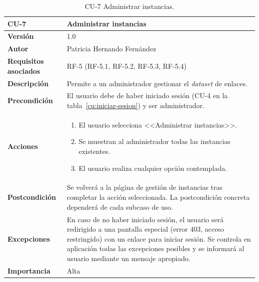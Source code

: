 \begin{table}[p]
	\centering
	\begin{tabularx}{\linewidth}{ p{} p{} }
		\toprule
		\textbf{CU-7}    & \textbf{Administrar instancias}\\
		\toprule
		\textbf{Versión}              & 1.0    \\
		\textbf{Autor}                & Patricia Hernando Fernández \\
		\textbf{Requisitos asociados} & RF-5 (RF-5.1, RF-5.2, RF-5.3, RF-5.4) \\
		\textbf{Descripción}          & Permite a un administrador gestionar el \textit{dataset} de enlaces.\\
		\textbf{Precondición}         & El usuario debe de haber iniciado sesión (CU-4 en la tabla~\ref{cu:iniciar-sesion}) y ser administrador. \\
		\textbf{Acciones}             &
		\begin{enumerate}
			\def\labelenumi{\arabic{enumi}.}
			\tightlist
			\item El usuario selecciona <<Administrar instancias>>.
			\item Se muestran al administrador todas las instancias existentes.
			\item El usuario realiza cualquier opción contemplada.
		\end{enumerate}\\
		\textbf{Postcondición}        & Se volverá a la página de gestión de instancias tras completar la acción seleccionada. La postcondición concreta dependerá de cada subcaso de uso. \\
		\textbf{Excepciones}          & En caso de no haber iniciado sesión, el usuario será redirigido a una pantalla especial (error 403, acceso restringido) con un enlace para iniciar sesión. Se controla en aplicación todas las excepciones posibles y se informará al usuario mediante un mensaje apropiado. \\
		\textbf{Importancia}          & Alta \\
		\bottomrule
	\end{tabularx}
	\caption{CU-7 Administrar instancias.}
	\label{cu:admin-instancias}
\end{table}

